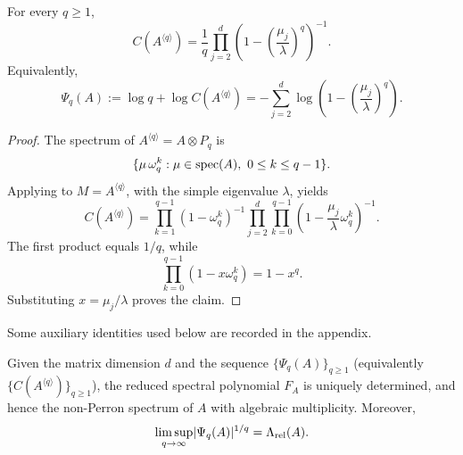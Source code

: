 \begin{proposition}
  \label{thm:finite-part-cyclic-lift-reduced-constant-closed}
  For every \(q\ge 1\),
  \[
    C(A^{\langle q\rangle})
    =\frac{1}{q}\prod_{j=2}^d
      \left(1-\left(\frac{\mu_j}{\lambda}\right)^q\right)^{-1}.
  \]
  Equivalently,
  \[
    \Psi_q(A):=\log q+\log C(A^{\langle q\rangle})
    =-\sum_{j=2}^d
      \log\!\left(1-\left(\frac{\mu_j}{\lambda}\right)^q\right).
  \]
\end{proposition}

\begin{proof}
  The spectrum of \(A^{\langle q\rangle}=A\otimes P_q\) is
  \[
    \{\mu\,\omega_q^k:\mu\in\operatorname{spec}(A),\ 0\le k\le q-1\}.
  \]
  Applying  to
  \(M=A^{\langle q\rangle}\), with the simple eigenvalue \(\lambda\),
  yields
  \[
    C(A^{\langle q\rangle})
    =\prod_{k=1}^{q-1}(1-\omega_q^k)^{-1}
      \prod_{j=2}^d\prod_{k=0}^{q-1}
        \left(1-\frac{\mu_j}{\lambda}\omega_q^k\right)^{-1}.
  \]
  The first product equals \(1/q\), while
  \[
    \prod_{k=0}^{q-1}(1-x\omega_q^k)=1-x^q.
  \]
  Substituting \(x=\mu_j/\lambda\) proves the claim.
\end{proof}

Some auxiliary identities used below are recorded in the appendix.

\begin{proposition}
  \label{thm:finite-part-cyclic-lift-spectrum-identifiability}
  Given the matrix dimension \(d\) and the sequence
  \(\{\Psi_q(A)\}_{q\ge 1}\) (equivalently
  \(\{C(A^{\langle q\rangle})\}_{q\ge 1}\)), the reduced
  spectral polynomial \(F_A\) is uniquely determined, and hence the
  non-Perron spectrum of \(A\) with algebraic multiplicity.
  Moreover,
  \[
    \limsup_{q\to\infty}\lvert \Psi_q(A) \rvert^{1/q}
    =\Lambda_{\mathrm{rel}}(A).
  \]
\end{proposition}

